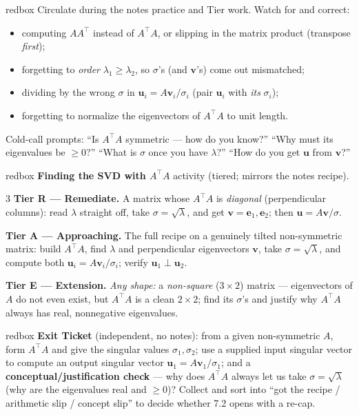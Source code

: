 \documentclass[10pt]{article}
\newcommand{\uu}{\mathbf{u}}
\newcommand{\vv}{\mathbf{v}}
\newcommand{\ee}{\mathbf{e}}
\newcommand{\T}{^{\top}}
\begin{document}
\begin{skillbox}{redbox}
Circulate during the notes practice and Tier work. Watch for and correct:
\begin{itemize}[leftmargin=1.2em, nosep]
  \item computing $A A\T$ instead of $A\T A$, or slipping in the matrix product (transpose \emph{first});
  \item forgetting to \emph{order} $\lambda_1\ge\lambda_2$, so $\sigma$'s (and $\vv$'s) come out mismatched;
  \item dividing by the wrong $\sigma$ in $\uu_i=A\vv_i/\sigma_i$ (pair $\uu_i$ with \emph{its} $\sigma_i$);
  \item forgetting to normalize the eigenvectors of $A\T A$ to unit length.
\end{itemize}
Cold-call prompts: ``Is $A\T A$ symmetric --- how do you know?'' ``Why must its eigenvalues be $\ge0$?''
``What is $\sigma$ once you have $\lambda$?'' ``How do you get $\uu$ from $\vv$?''
\end{skillbox}

\begin{skillbox}{redbox}
\textbf{Finding the SVD with $A\T A$} activity (tiered; mirrors the notes recipe).
\begin{multicols}{3}
\textbf{Tier R --- Remediate.} A matrix whose $A\T A$ is \emph{diagonal} (perpendicular columns): read
$\lambda$ straight off, take $\sigma=\sqrt{\lambda}$, and get $\vv=\ee_1,\ee_2$; then $\uu=A\vv/\sigma$.

\columnbreak
\textbf{Tier A --- Approaching.} The full recipe on a genuinely tilted non-symmetric matrix: build
$A\T A$, find $\lambda$ and perpendicular eigenvectors $\vv$, take $\sigma=\sqrt{\lambda}$, and compute
both $\uu_i=A\vv_i/\sigma_i$; verify $\uu_1\perp\uu_2$.

\columnbreak
\textbf{Tier E --- Extension.} \emph{Any shape:} a \emph{non-square} ($3\times2$) matrix --- eigenvectors of
$A$ do not even exist, but $A\T A$ is a clean $2\times2$; find its $\sigma$'s and justify why $A\T A$
always has real, nonnegative eigenvalues.
\end{multicols}
\end{skillbox}

\begin{skillbox}{redbox}
\textbf{Exit Ticket} (independent, no notes): from a given non-symmetric $A$, form $A\T A$ and give the
singular values $\sigma_1,\sigma_2$; use a supplied input singular vector to compute an output singular
vector $\uu_1=A\vv_1/\sigma_1$; and a \textbf{conceptual/justification check} --- why does $A\T A$
always let us take $\sigma=\sqrt{\lambda}$ (why are the eigenvalues real and $\ge0$)? Collect and sort
into ``got the recipe / arithmetic slip / concept slip'' to decide whether 7.2 opens with a re-cap.
\end{skillbox}
\end{document}
